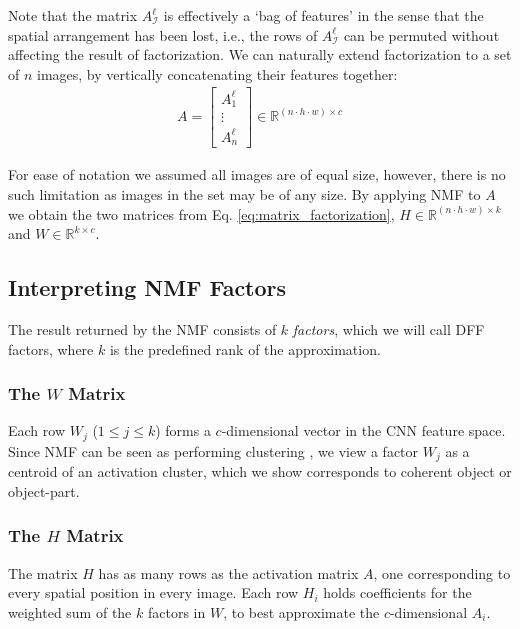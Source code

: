 \documentclass[runningheads]{llncs}
\begin{document}
	Note that the matrix $A_\mathcal{I}^\ell$ is effectively a `bag of features' in the sense that the spatial arrangement has been lost, i.e., the rows of $A_\mathcal{I}^\ell$ can be permuted without affecting the result of factorization. We can naturally extend factorization to a set of $n$ images, by vertically concatenating their features together:
	\begin{align}
	A = \begin{bmatrix}
	A_1^\ell\\[0.3em]
	\vdots \\[0.3em]
	A_n^\ell 
	\end{bmatrix}
	\in \mathbb{R}^{(n\cdot h\cdot w)\times c}
	\end{align}
	
    For ease of notation we assumed all images are of equal size, however, there is no such limitation as images in the set may be of any size.
	By applying NMF to $A$ we obtain the two matrices from Eq. \ref{eq:matrix_factorization}, $H\in \mathbb{R}^{(n\cdot h\cdot w)\times k}$ and $W\in \mathbb{R}^{k\times c}$.
	
	\subsection{Interpreting NMF Factors} \label{sec:Interpreting NMF Factors}
	
	The result returned by the NMF consists of $k$ \emph{factors}, which we will call DFF factors, where $k$ is the predefined rank of the approximation. 

	\subsubsection{The $W$ Matrix}
	Each row $W_j$ ($1\leq j\leq k$) forms a $c$-dimensional vector in the CNN feature space. Since NMF can be seen as performing clustering \cite{ding2005equivalence}, we view a factor $W_j$ as a centroid of an activation cluster, which we show corresponds to coherent object or object-part.
	
	\subsubsection{The $H$ Matrix}
	The matrix $H$ has as many rows as the activation matrix $A$, one corresponding to every spatial position in every image. Each row $H_i$ holds coefficients for the weighted sum of the $k$ factors in $W$, to best approximate the $c$-dimensional $A_i$.
	
\end{document}
